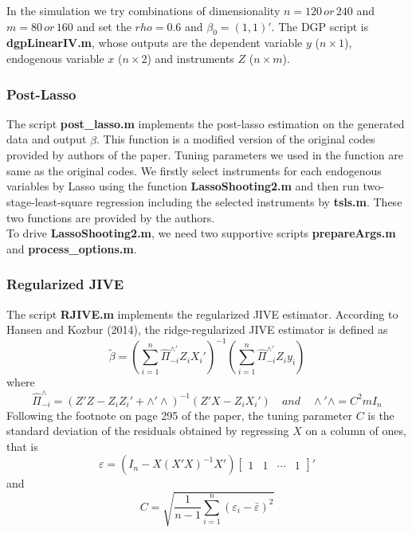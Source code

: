 \documentclass[12pt, a4paper]{article}
\begin{document}
\noindent In the simulation we try combinations of dimensionality $n = 120 \, or \, 240$ and $m = 80 \, or \, 160$ and set the $rho = 0.6$ and $\beta_0 = (1,1)'$. The DGP script is \textbf{dgpLinearIV.m}, whose outputs are the dependent variable $y$ ($n \times 1$), endogenous variable $x$ ($n \times 2$) and instruments $Z$ ($n \times m$).
\subsubsection*{Post-Lasso}

The script \textbf{post\_lasso.m} implements the post-lasso estimation on the generated data and output $\hat{\beta}$. This function is a modified version of the original codes provided by authors of the paper\cite{bcch}. Tuning parameters we used in the function are same as the original codes. We firstly select instruments for each endogenous variables by Lasso using the function \textbf{LassoShooting2.m} and then run two-stage-least-square regression including the selected instruments by \textbf{tsls.m}. These two functions are provided by the authors\cite{bcch}.\\
\noindent To drive \textbf{LassoShooting2.m}, we need two supportive scripts \textbf{prepareArgs.m} and \textbf{process\_options.m}.

\subsubsection*{Regularized JIVE}

The script \textbf{RJIVE.m} implements the regularized JIVE estimator. According to Hansen and Kozbur (2014), the ridge-regularized JIVE estimator is defined as
\begin{equation}
\tilde{\beta} = (\sum\limits^n_{i = 1} \hat{\Pi}_{-i}^{\wedge'}Z_iX_i')^{-1}(\sum\limits^n_{i = 1} \hat{\Pi}_{-i}^{\wedge'}Z_iy_i)
\end{equation}
where 
\begin{equation}
\hat{\Pi}_{-i}^{\wedge} = (Z'Z - Z_iZ_i' + \wedge'\wedge)^{-1}(Z'X - Z_iX_i')\quad and \quad \wedge'\wedge = C^2mI_n
\end{equation}
Following the footnote on page 295 of the paper\cite{rjive}, the tuning parameter $C$ is the standard deviation of the residuals obtained by regressing $X$ on a column of ones, that is
\begin{equation}
\varepsilon = (I_n - X(X'X)^{-1}X')\begin{bmatrix} 1&1&\cdots&1\end{bmatrix}'
\end{equation}
and
\begin{equation}
C = \sqrt{\frac{1}{n-1}\sum\limits_{i=1}^{n}(\varepsilon_i - \bar{\varepsilon})^2}
\end{equation}
\end{document}
